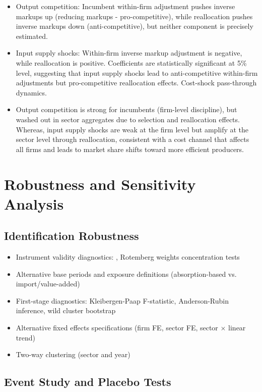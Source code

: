 \documentclass[12pt]{article}
\begin{document}
\begin{itemize}
    \item Output competition: Incumbent within-firm adjustment pushes inverse markups up (reducing markups - pro-competitive), while reallocation pushes inverse markups down (anti-competitive), but neither component is precisely estimated.
    \item Input supply shocks: Within-firm inverse markup adjustment is negative, while reallocation is positive. Coefficients are statistically significant at 5\% level, suggesting that input supply shocks lead to anti-competitive within-firm adjustments but pro-competitive reallocation effects. Cost-shock pass-through dynamics. 
    \item Output competition is strong for incumbents (firm-level discipline), but washed out in sector aggregates due to selection and reallocation effects. Whereas, input supply shocks are weak at the firm level but amplify at the sector level through reallocation, consistent with a cost channel that affects all firms and leads to market share shifts toward more efficient producers. 
\end{itemize}

\section{Robustness and Sensitivity Analysis}

\subsection{Identification Robustness}

\begin{itemize}
    \item Instrument validity diagnostics: \autocite{adaoShiftShareDesignsTheory2019}, Rotemberg weights concentration tests
    \item Alternative base periods and exposure definitions (absorption-based vs. import/value-added)
    \item First-stage diagnostics: Kleibergen-Paap F-statistic, Anderson-Rubin inference, wild cluster bootstrap
    \item Alternative fixed effects specifications (firm FE, sector FE, sector $\times$ linear trend)
    \item Two-way clustering (sector and year)
\end{itemize}

\subsection{Event Study and Placebo Tests}
\end{document}
